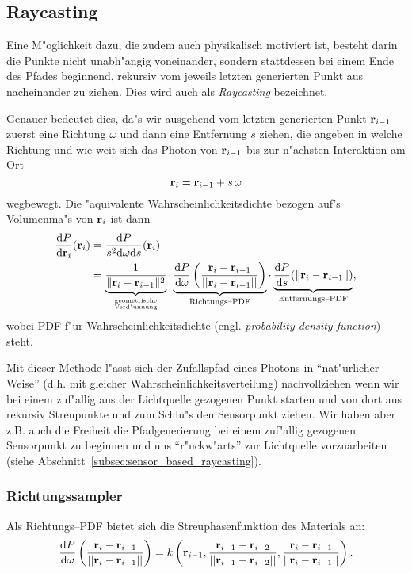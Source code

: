 	\subsection{Raycasting}
	Eine M"oglichkeit dazu, die zudem auch physikalisch motiviert ist, besteht darin die Punkte nicht unabh"angig voneinander, sondern stattdessen bei einem Ende des Pfades beginnend, rekursiv vom jeweils letzten generierten Punkt aus nacheinander zu ziehen. Dies wird auch als {\em Raycasting} bezeichnet.
	
	Genauer bedeutet dies, da"s wir ausgehend vom letzten generierten Punkt $\mathbf{r}_{i-1}$ zuerst eine Richtung $\omega$ und dann eine Entfernung $s$ ziehen, die angeben in welche Richtung und wie weit sich das Photon von $\mathbf{r}_{i-1}$ bis zur n"achsten Interaktion am Ort
	$$\mathbf{r}_i=\mathbf{r}_{i-1}+s\,\omega$$
	wegbewegt.
	Die "aquivalente Wahrscheinlichkeitsdichte bezogen auf's Volumenma"s von $\mathbf{r}_i$ ist dann
	\begin{align*}
		\frac{\text{d}P}{\text{d}\mathbf{r}_i}(\mathbf{r}_i) &= \frac{\text{d}P}{s^2 \text{d}\omega\text{d}s}(\mathbf{r}_i) \\
		&= \underbrace{\frac{1}{\|\mathbf{r}_i - \mathbf{r}_{i-1}\|^2}}_{\text{geometrische}\atop\text{Verd"unnung}} \cdot\underbrace{\frac{\text{d}P}{\text{d}\omega}\left(\frac{\mathbf{r}_i - \mathbf{r}_{i-1}}{||\mathbf{r}_i - \mathbf{r}_{i-1}||}\right)}_{\text{Richtungs--PDF}} \cdot \underbrace{\frac{\text{d}P}{\text{d}s}(\|\mathbf{r}_i-\mathbf{r}_{i-1}\|)}_{\text{Entfernungs--PDF}},
	\end{align*}
	wobei PDF f"ur Wahrscheinlichkeitsdichte (engl. {\em probability density function}) steht.
	
	Mit dieser Methode l"asst sich der Zufallspfad eines Photons in ``nat"urlicher Weise'' (d.h. mit gleicher Wahrscheinlichkeitsverteilung) nachvollziehen wenn wir bei einem zuf"allig aus der Lichtquelle gezogenen Punkt starten und von dort aus rekursiv Streupunkte und zum Schlu"s den Sensorpunkt ziehen. Wir haben aber z.B. auch die Freiheit die Pfadgenerierung bei einem zuf"allig gezogenen Sensorpunkt zu beginnen und uns ``r"uckw"arts'' zur Lichtquelle vorzuarbeiten (siehe Abschnitt~\ref{subsec:sensor_based_raycasting}).
	
	\subsubsection{Richtungssampler}
	Als Richtungs--PDF bietet sich die Streuphasenfunktion des Materials an:
	\begin{equation*}
		\frac{\text{d}P}{\text{d}\omega}\left(\frac{\mathbf{r}_i - \mathbf{r}_{i-1}}{||\mathbf{r}_i - \mathbf{r}_{i-1}||}\right) = k\left(\mathbf{r}_{i-1},\frac{\mathbf{r}_{i-1} - \mathbf{r}_{i-2}}{||\mathbf{r}_{i-1} - \mathbf{r}_{i-2}||},\frac{\mathbf{r}_i - \mathbf{r}_{i-1}}{||\mathbf{r}_i - \mathbf{r}_{i-1}||}\right).
		\label{eq:direction_pdf}
	\end{equation*}
	
